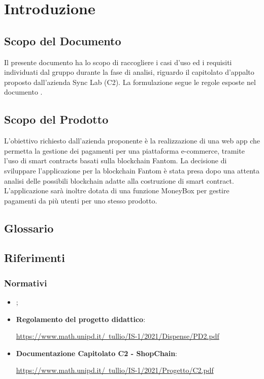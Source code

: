 \section{Introduzione} \label{section:introduzione}

\subsection{Scopo del Documento}
Il presente documento ha lo scopo di raccogliere i casi d'uso ed i requisiti individuati dal gruppo
durante la fase di analisi, riguardo il capitolato d'appalto proposto dall'azienda Sync Lab (C2).
La formulazione segue le regole esposte nel documento \docNameVersionNdP{}.

\subsection{Scopo del Prodotto}
L'obiettivo richiesto dall'azienda proponente è la realizzazione di una web app\glo{} che permetta la gestione dei pagamenti per una piattaforma e-commerce\glo{}, tramite l'uso di smart contracts\glo{} basati sulla blockchain\glo{} Fantom\glo{}.
La decisione di sviluppare l'applicazione per la blockchain\glo{} Fantom\glo{} è stata presa dopo una attenta analisi delle possibili blockchain\glo{} adatte alla costruzione di smart contract\glo{}.
L'applicazione sarà inoltre dotata di una funzione MoneyBox\glo{} per gestire pagamenti da più utenti per uno stesso prodotto.

\subsection{Glossario}
\gloDesc{}

\subsection{Riferimenti}

\subsubsection{Normativi}
\begin{itemize}
    \item \textbf{\docNameVersionNdP{}};
    \item \textbf{Regolamento del progetto didattico}:
          \begin{center}
              \href{https://www.math.unipd.it/~tullio/IS-1/2021/Dispense/PD2.pdf}{https://www.math.unipd.it/~tullio/IS-1/2021/Dispense/PD2.pdf}
          \end{center}
    \item \textbf{Documentazione Capitolato C2 - ShopChain}:
          \begin{center}
              \href{https://www.math.unipd.it/~tullio/IS-1/2021/Progetto/C2.pdf}{https://www.math.unipd.it/~tullio/IS-1/2021/Progetto/C2.pdf}
          \end{center}
\end{itemize}

